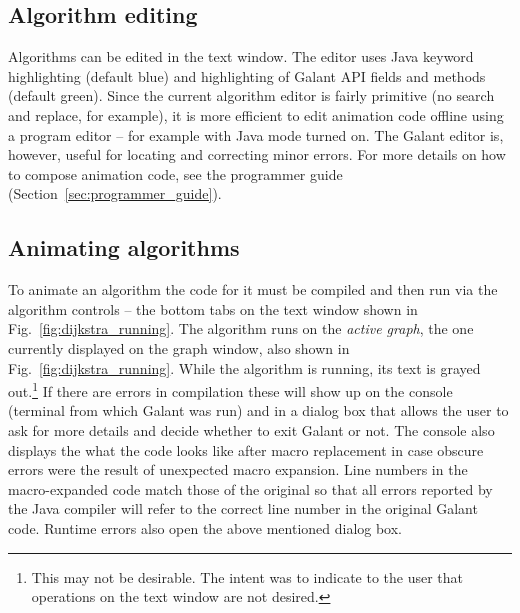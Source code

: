 \subsection{Algorithm editing}
\label{sec:algorithm_editing}

Algorithms can be edited in the text window. The
editor uses Java keyword highlighting (default blue) and
highlighting of Galant API fields and methods (default green).
Since the current algorithm editor is fairly primitive (no search and replace, for example),
it is more efficient to edit animation code offline using a program editor --
for example  with Java mode turned on.
The Galant editor is, however, useful for locating and correcting minor errors.
For more details on how to compose animation code, see the programmer guide
(Section~\ref{sec:programmer_guide}).

\subsection{Animating algorithms}
\label{sec:animating_algorithms}



To animate an algorithm the code for it must be compiled and then run via the
algorithm controls
 -- the bottom tabs on the text window shown in Fig.~\ref{fig:dijkstra_running}.
The algorithm runs on the \emph{active graph}, the one currently displayed
on the graph window, also shown in Fig.~\ref{fig:dijkstra_running}.
While the algorithm is running, its text is grayed out.\footnote{
  This may not be desirable. The intent was to indicate to the user that
  operations on the text window are not desired.
  }
If there are errors in compilation these will show up on the console (terminal
from which Galant was run) and in a dialog box that allows the user to ask for more details
and decide whether to exit Galant or not.
The console also displays the what the code looks like after macro replacement
in case obscure errors were the result of unexpected macro expansion.
Line numbers in the macro-expanded code match those of the original so that
all errors reported by the Java compiler will refer to the correct line number
in the original Galant code.
Runtime errors also open the above mentioned
dialog box.

